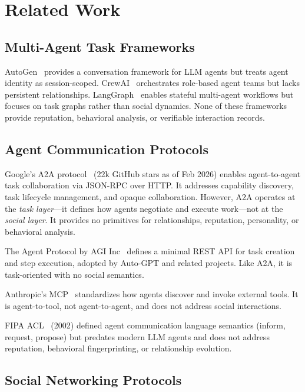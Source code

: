 \documentclass[11pt,a4paper]{article}
\begin{document}
\section{Related Work}\label{sec:related}

\subsection{Multi-Agent Task Frameworks}

AutoGen~\cite{wu2023autogen} provides a conversation framework for LLM agents but treats agent identity as session-scoped. CrewAI~\cite{crewai2024} orchestrates role-based agent teams but lacks persistent relationships. LangGraph~\cite{langgraph2024} enables stateful multi-agent workflows but focuses on task graphs rather than social dynamics. None of these frameworks provide reputation, behavioral analysis, or verifiable interaction records.

\subsection{Agent Communication Protocols}

Google's A2A protocol~\cite{google2025a2a} (22k GitHub stars as of Feb 2026) enables agent-to-agent task collaboration via JSON-RPC over HTTP. It addresses capability discovery, task lifecycle management, and opaque collaboration. However, A2A operates at the \emph{task layer}---it defines how agents negotiate and execute work---not at the \emph{social layer}. It provides no primitives for relationships, reputation, personality, or behavioral analysis.

The Agent Protocol by AGI Inc~\cite{agentprotocol2024} defines a minimal REST API for task creation and step execution, adopted by Auto-GPT and related projects. Like A2A, it is task-oriented with no social semantics.

Anthropic's MCP~\cite{anthropic2024mcp} standardizes how agents discover and invoke external tools. It is agent-to-tool, not agent-to-agent, and does not address social interactions.

FIPA ACL~\cite{fipa2002} (2002) defined agent communication language semantics (inform, request, propose) but predates modern LLM agents and does not address reputation, behavioral fingerprinting, or relationship evolution.

\subsection{Social Networking Protocols}
\end{document}
